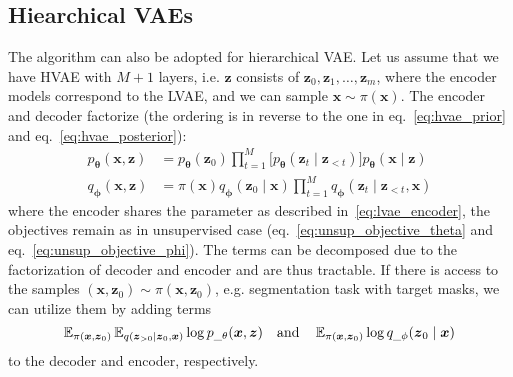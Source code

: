 \subsection{Hiearchical VAEs}
The algorithm can also be adopted for hierarchical VAE. Let us assume that we have HVAE with $M+1$ layers, i.e. $\boldsymbol{z}$ consists of 
$\boldsymbol{z}_0,\boldsymbol{z}_1,\dots,\boldsymbol{z}_m$, where the encoder models correspond to the LVAE, and we can sample $\boldsymbol{x} \sim \pi(\boldsymbol{x})$.
The encoder and decoder factorize (the ordering is in reverse to the one in eq.~\ref{eq:hvae_prior} and eq.~\ref{eq:hvae_posterior}):
\begin{align*}
    p_{\boldsymbol{\theta}}(\boldsymbol{x},\boldsymbol{z})&=p_{\boldsymbol{\theta}}(\boldsymbol{z}_{0}) \prod_{t=1}^{M}\bigl[p_{\boldsymbol{\theta}}(\boldsymbol{z}_{t}\mid\boldsymbol{z}_{<t}) \bigr]  p_{\boldsymbol{\theta}}(\boldsymbol{x}\mid\boldsymbol{z})  \\
    q_{\boldsymbol{\phi}}(\boldsymbol{x},\boldsymbol{z}) &=\pi(\boldsymbol{x})q_{\boldsymbol{\phi}}(\boldsymbol{z}_{0}\mid\boldsymbol{x}) \prod_{t=1}^{M}  q_{\boldsymbol{\phi}}(\boldsymbol{z}_{t}\mid\boldsymbol{z}_{<t},\boldsymbol{x}) 
\end{align*}
where the encoder shares the parameter as described in~\ref{eq:lvae_encoder}, the objectives remain as in unsupervised case (eq.~\ref{eq:unsup_objective_theta} and eq.~\ref{eq:unsup_objective_phi}).
The terms can be decomposed due to the factorization of decoder and encoder and are thus tractable. If there is 
access to the samples $(\boldsymbol{x},\boldsymbol{z}_0) \sim \pi(\boldsymbol{x},\boldsymbol{z}_0)$, e.g. segmentation task with target masks, we can utilize them 
by adding terms
$$
\operatorname{\mathbb{E}}_{\pi(\boldsymbol{x},\boldsymbol{z}_0)}\operatorname{\mathbb{E}}_{q(\boldsymbol{z}_{>0} \mid\boldsymbol{z}_0,\boldsymbol{x})} \log p_{\_\theta}(\boldsymbol{x},\boldsymbol{z}) 
\quad\text{and}\quad
\operatorname{\mathbb{E}}_{\pi(\boldsymbol{x},\boldsymbol{z}_0)} \log q_{\_\phi}(\boldsymbol{z}_0\mid\boldsymbol{x})
$$
to the decoder and encoder, respectively. 
